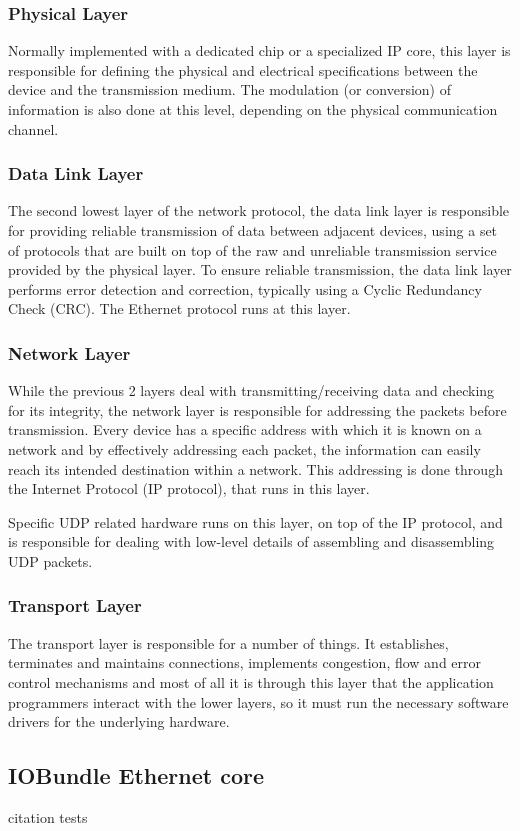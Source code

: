 \subsubsection{Physical Layer}
Normally implemented with a dedicated chip or a specialized IP
core, this layer is responsible for defining the physical and electrical
specifications between the device and the transmission medium. The modulation
(or conversion) of information is also done at this level, depending on the
physical communication channel.

\subsubsection{Data Link Layer}
The second lowest layer of the network protocol, the data link
layer is responsible for providing reliable transmission of data between
adjacent devices, using a set of protocols that are built on top of the raw
and unreliable transmission service provided by the physical layer. To ensure
reliable transmission, the data link layer performs error detection and
correction, typically using a Cyclic Redundancy Check (CRC). The Ethernet
protocol runs at this layer.

\subsubsection{Network Layer}
While the previous 2 layers deal with transmitting/receiving data
and checking for its integrity, the network layer is responsible for
addressing the packets before transmission. Every device has a specific
address with which it is known on a network and by effectively addressing
each packet, the information can easily reach its intended destination within
a network. This addressing is done through the Internet Protocol (IP
protocol), that runs in this layer.

    Specific UDP related hardware runs on this layer, on top of the
IP protocol, and is responsible for dealing with low-level details of
assembling and disassembling UDP packets.

\subsubsection{Transport Layer}
The transport layer is responsible for a number of things. It
establishes, terminates and maintains connections, implements congestion,
flow and error control mechanisms and most of all it is through this layer
that the application programmers interact with the lower layers, so it must
run the necessary software drivers for the underlying hardware.


\subsection{IOBundle Ethernet core}
citation tests~\cite{rec2020,bib:riscv_list}~